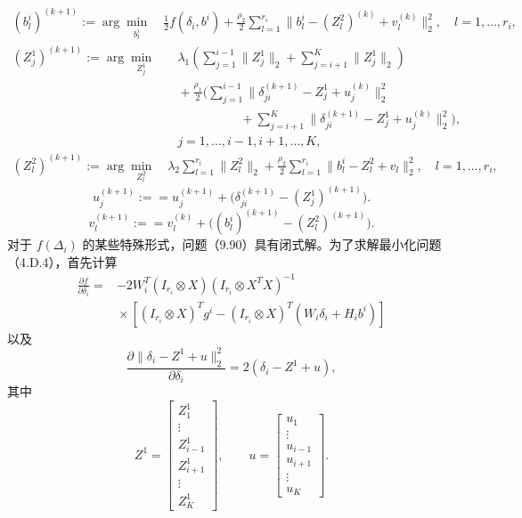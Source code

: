 \begin{equation}
\begin{aligned}
(b_l^i)^{(k+1)}:=\arg\min_{b_l^i}\quad
\frac12f(\delta_i,b^i)+\frac{\rho_2}{2}\sum_{l=1}^{r_i}
\|b_l^i-(Z_l^2)^{(k)}+v_l^{(k)}\|_2^2,
\quad l=1,\ldots,r_i,
\end{aligned}\tag{4.D.13}
\end{equation}
\begin{equation}
\begin{aligned}
(Z_j^1)^{(k+1)}:=\arg\min_{Z_j^1}\quad
&\lambda_1\left(\sum_{j=1}^{i-1}\|Z_j^1\|_2+\sum_{j=i+1}^{K}\|Z_j^1\|_2\right)\\
&{}+\frac{\rho_1}{2}\biggl(\sum_{j=1}^{i-1}
\|\delta_{ji}^{(k+1)}-Z_j^1+u_j^{(k)}\|_2^2\\
&\hspace{5em}{}+\sum_{j=i+1}^{K}
\|\delta_{ji}^{(k+1)}-Z_j^1+u_j^{(k)}\|_2^2\biggr),\\
&j=1,\ldots,i-1,i+1,\ldots,K,
\end{aligned}\tag{4.D.14}
\end{equation}
\begin{equation}
\begin{aligned}
(Z_l^2)^{(k+1)}:=\arg\min_{Z_l^2}\quad
\lambda_2\sum_{l=1}^{r_i}\|Z_l^2\|_2
+\frac{\rho_2}{2}\sum_{l=1}^{r_i}\|b_l^i-Z_l^2+v_l\|_2^2,
\quad l=1,\ldots,r_i,
\end{aligned}\tag{4.D.15}
\end{equation}
\begin{equation}
u_j^{(k+1)}:==u_j^{(k+1)}+
\bigl(\delta_{ji}^{(k+1)}-(Z_j^1)^{(k+1)}\bigr).\tag{4.D.16}
\end{equation}
\begin{equation}
v_l^{(k+1)}:==v_l^{(k)}+
\bigl((b_l^i)^{(k+1)}-(Z_l^2)^{(k+1)}\bigr).\tag{4.D.17}
\end{equation}
对于 $f(\Delta_i)$ 的某些特殊形式，问题（9.90）具有闭式解。为了求解最小化问题（4.D.4），首先计算
\[
\begin{aligned}
\frac{\partial f}{\partial\delta_i}
={}&-2W_i^T(I_{r_i}\otimes X)(I_{r_i}\otimes X^TX)^{-1}\\
&{}\times[(I_{r_i}\otimes X)^Tg^i-(I_{r_i}\otimes X)^T(W_i\delta_i+H_ib^i)]
\end{aligned}
\]
以及
\begin{equation}
\frac{\partial\|\delta_i-Z^1+u\|_2^2}{\partial\delta_i}
=2(\delta_i-Z^1+u),\tag{4.D.18}
\end{equation}
其中
\[
Z^1=\begin{bmatrix}Z_1^1\\\vdots\\Z_{i-1}^1\\Z_{i+1}^1\\\vdots\\Z_K^1\end{bmatrix},\qquad
u=\begin{bmatrix}u_1\\\vdots\\u_{i-1}\\u_{i+1}\\\vdots\\u_K\end{bmatrix}.
\]
